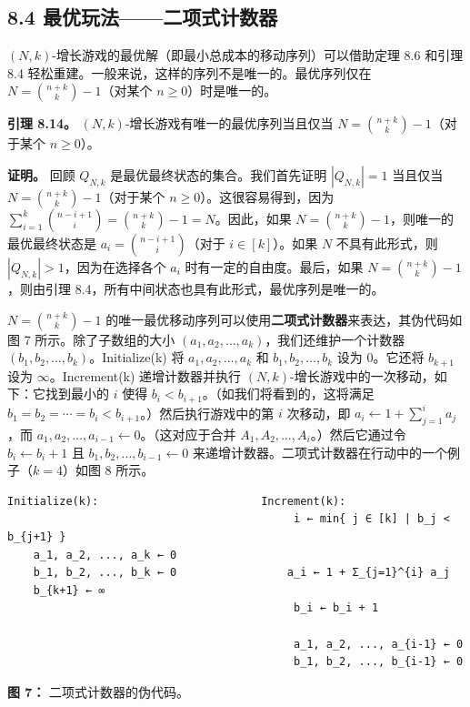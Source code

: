 \documentclass[12pt,a4paper]{ctexart}
\theoremstyle{remark}
\begin{document}
\subsection{8.4 最优玩法——二项式计数器}

$(N,k)$-增长游戏的最优解（即最小总成本的移动序列）可以借助定理 8.6 和引理 8.4 轻松重建。一般来说，这样的序列不是唯一的。最优序列仅在 $N=\binom{n+k}{k}-1$（对某个 $n\geq 0$）时是唯一的。

\textbf{引理 8.14。} $(N,k)$-增长游戏有唯一的最优序列当且仅当 $N=\binom{n+k}{k}-1$（对于某个 $n\geq 0$）。

\textbf{证明。} 回顾 $Q_{N,k}$ 是最优最终状态的集合。我们首先证明 $|Q_{N,k}|=1$ 当且仅当 $N=\binom{n+k}{k}-1$（对于某个 $n\geq 0$）。这很容易得到，因为 $\sum_{i=1}^{k}\binom{n-i+1}{i}=\binom{n+k}{k}-1=N$。因此，如果 $N=\binom{n+k}{k}-1$，则唯一的最优最终状态是 $a_i=\binom{n-i+1}{i}$（对于 $i\in[k]$）。如果 $N$ 不具有此形式，则 $|Q_{N,k}|>1$，因为在选择各个 $a_i$ 时有一定的自由度。最后，如果 $N=\binom{n+k}{k}-1$，则由引理 8.4，所有中间状态也具有此形式，最优序列是唯一的。

$N=\binom{n+k}{k}-1$ 的唯一最优移动序列可以使用\textbf{二项式计数器}来表达，其伪代码如图 7 所示。除了子数组的大小 $(a_1,a_2,\ldots,a_k)$，我们还维护一个计数器 $(b_1,b_2,\ldots,b_k)$。Initialize(k) 将 $a_1,a_2,\ldots,a_k$ 和 $b_1,b_2,\ldots,b_k$ 设为 0。它还将 $b_{k+1}$ 设为 $\infty$。Increment(k) 递增计数器并执行 $(N,k)$-增长游戏中的一次移动，如下：它找到最小的 $i$ 使得 $b_i<b_{i+1}$。（如我们将看到的，这将满足 $b_1=b_2=\cdots=b_i<b_{i+1}$。）然后执行游戏中的第 $i$ 次移动，即 $a_i\leftarrow 1+\sum_{j=1}^{i}a_j$，而 $a_1,a_2,\ldots,a_{i-1}\leftarrow 0$。（这对应于合并 $A_1,A_2,\ldots,A_i$。）然后它通过令 $b_i\leftarrow b_i+1$ 且 $b_1,b_2,\ldots,b_{i-1}\leftarrow 0$ 来递增计数器。二项式计数器在行动中的一个例子（$k=4$）如图 8 所示。

\begin{verbatim}
Initialize(k):                         Increment(k):
                                            i ← min{ j ∈ [k] | b_j < b_{j+1} }
    a_1, a_2, ..., a_k ← 0
    b_1, b_2, ..., b_k ← 0                 a_i ← 1 + Σ_{j=1}^{i} a_j
    b_{k+1} ← ∞
                                            b_i ← b_i + 1

                                            a_1, a_2, ..., a_{i-1} ← 0
                                            b_1, b_2, ..., b_{i-1} ← 0
\end{verbatim}

\textbf{图 7：} 二项式计数器的伪代码。
\end{document}
